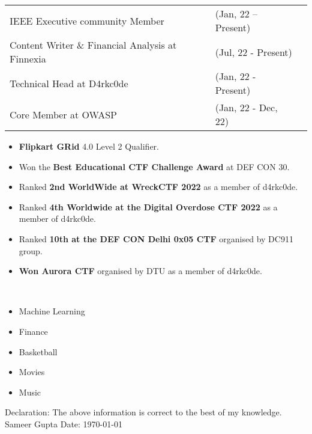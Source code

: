 \documentclass[10pt]{extarticle}
\newcommand{\yourname}{Sameer Gupta}%
\begin{document}
\vspace{0pt}
\begin{contained}
\begin{longtable}{p{}p{}p{}}
    IEEE Executive community Member & (Jan, 22 – Present)\\
    Content Writer \& Financial Analysis at Finnexia & (Jul, 22 - Present)\\
    Technical Head at D4rkc0de & (Jan, 22 - Present)\\
    Core Member at OWASP & (Jan, 22 - Dec, 22) \\
\end{longtable}
\vspace{0pt}
\end{contained}
\begin{contained}
\vspace{0pt}
\begin{itemize}
    \setlength\itemsep{0.5pt}
    \item \textbf{Flipkart GRid} 4.0 Level 2 Qualifier.
    \item Won the \textbf{Best Educational CTF Challenge Award} at DEF CON 30.
    \item Ranked \textbf{2nd WorldWide at WreckCTF 2022} as a member of d4rkc0de.
    \item Ranked \textbf{4th Worldwide at the Digital Overdose CTF 2022} as a member of d4rkc0de.
    \item Ranked \textbf{10th at the DEF CON Delhi 0x05 CTF} organised by DC911 group.
    \item \textbf{Won Aurora CTF} organised by DTU as a member of d4rkc0de.
\end{itemize}
\vspace{0pt}
\end{contained}
\begin{contained}\\
\begin{itemize}
    \setlength\itemsep{0.5pt}
    \item Machine Learning 
    \item Finance
    \item Basketball
    \item Movies
    \item Music
\end{itemize}
\end{contained}
Declaration: The above information is correct to the best of my knowledge.\newline
\yourname\newline
Date: \today
\end{document}

